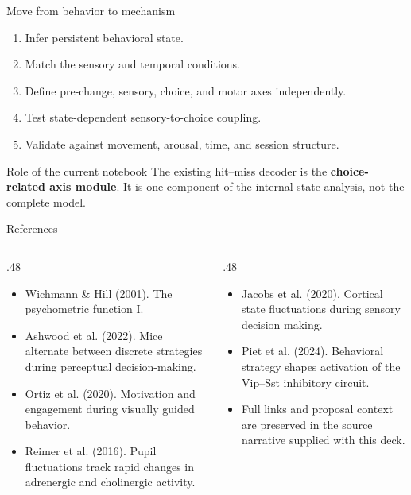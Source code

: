\documentclass[aspectratio=169,10pt]{beamer}
\begin{document}
\begin{frame}{Move from behavior to mechanism}
  \begin{enumerate}
    \item Infer persistent behavioral state.
    \item Match the sensory and temporal conditions.
    \item Define pre-change, sensory, choice, and motor axes independently.
    \item Test state-dependent sensory-to-choice coupling.
    \item Validate against movement, arousal, time, and session structure.
  \end{enumerate}

  \vspace{.7em}
  \begin{block}{Role of the current notebook}
    The existing hit--miss decoder is the \textbf{choice-related axis module}.
    It is one component of the internal-state analysis, not the complete model.
  \end{block}
\end{frame}

\begin{frame}{References}
  \begin{columns}[T,onlytextwidth]
    \begin{column}{.48\textwidth}
      {\scriptsize
      \begin{itemize}
        \item Wichmann \& Hill (2001). The psychometric function I.
        \item Ashwood et al. (2022). Mice alternate between discrete strategies during perceptual decision-making.
        \item Ortiz et al. (2020). Motivation and engagement during visually guided behavior.
        \item Reimer et al. (2016). Pupil fluctuations track rapid changes in adrenergic and cholinergic activity.
      \end{itemize}}
    \end{column}
    \begin{column}{.48\textwidth}
      {\scriptsize
      \begin{itemize}
        \item Jacobs et al. (2020). Cortical state fluctuations during sensory decision making.
        \item Piet et al. (2024). Behavioral strategy shapes activation of the Vip--Sst inhibitory circuit.
        \item Full links and proposal context are preserved in the source narrative supplied with this deck.
      \end{itemize}}
    \end{column}
  \end{columns}
\end{frame}

\end{document}
